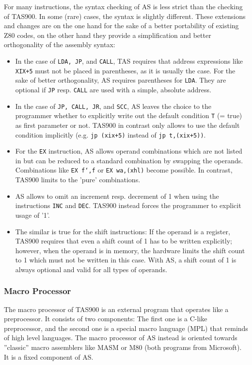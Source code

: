 \documentclass[12pt,twoside]{report}
\newcommand{\tty}[1]{{\tt #1}}
\begin{document}
For many instructions, the syntax checking of AS is less strict than
the checking of TAS900.  In some (rare) cases, the syntax is slightly
different.  These extensions and changes are on the one hand for the
sake of a better portability of existing Z80 codes, on the other hand
they provide a simplification and better orthogonality of the
assembly syntax:
\begin{itemize}
\item{In the case of \tty{LDA, JP}, and \tty{CALL}, TAS requires that address
      expressions like \tty{XIX+5} must not be placed in parentheses, as it
      is usually the case.  For the sake of better orthogonality, AS
      requires parentheses for \tty{LDA}.  They are optional if \tty{JP} resp.
      \tty{CALL} are used with a simple, absolute address.}
\item{In the case of \tty{JP, CALL, JR}, and \tty{SCC}, AS leaves the choice to the
      programmer whether to explicitly write out the default condition
      \tty{T} (= true) as first parameter or not.  TAS900 in contrast only
      allows to use the default condition implicitly (e.g. \tty{jp (xix+5)}
      instead of \tty{jp t,(xix+5))}.}
\item{For the \tty{EX} instruction, AS allows operand combinations which are
      not listed in \cite{Tosh900} but can be reduced to a standard
      combination by swapping the operands.  Combinations like \tty{EX f`,f}
      or \tty{EX wa,(xhl)} become possible.  In contrast, TAS900 limits to
      the 'pure' combinations.}
\item{AS allows to omit an increment resp. decrement of 1 when using the
      instructions \tty{INC} and \tty{DEC}.  TAS900 instead forces the programmer to
      explicit usage of '1'.}
\item{The similar is true for the shift instructions: If the operand is
      a register, TAS900 requires that even a shift count of 1 has to
      be written explicitly; however, when the operand is in memory,
      the hardware limits the shift count to 1 which must not be written
      in this case.  With AS, a shift count of 1 is always optional and
      valid for all types of operands.}
\end{itemize}

\subsubsection{Macro Processor}

The macro processor of TAS900 is an external program that operates
like a preprocessor.  It consists of two components: The first one is
a C-like preprocessor, and the second one is a special macro language
(MPL) that reminds of high level languages.  The macro processor of
AS instead is oriented towards ''classic'' macro assemblers like MASM
or M80 (both programs from Microsoft).  It is a fixed component of
AS.
\end{document}
